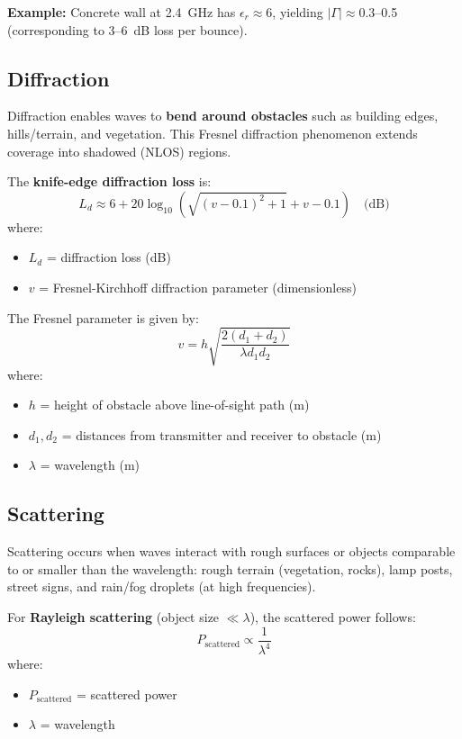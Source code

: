 \textbf{Example:} Concrete wall at 2.4~GHz has $\epsilon_r \approx 6$, yielding $|\Gamma| \approx 0.3$--0.5 (corresponding to 3--6~dB loss per bounce).

\subsection{Diffraction}

Diffraction enables waves to \textbf{bend around obstacles} such as building edges, hills/terrain, and vegetation. This Fresnel diffraction phenomenon extends coverage into shadowed (NLOS) regions.

The \textbf{knife-edge diffraction loss} is:
\begin{equation}
L_d \approx 6 + 20\log_{10}\left(\sqrt{(v-0.1)^2 + 1} + v - 0.1\right) \quad \text{(dB)}
\end{equation}
where:
\begin{itemize}
\item $L_d$ = diffraction loss (dB)
\item $v$ = Fresnel-Kirchhoff diffraction parameter (dimensionless)
\end{itemize}

The Fresnel parameter is given by:
\begin{equation}
v = h\sqrt{\frac{2(d_1 + d_2)}{\lambda d_1 d_2}}
\end{equation}
where:
\begin{itemize}
\item $h$ = height of obstacle above line-of-sight path (m)
\item $d_1, d_2$ = distances from transmitter and receiver to obstacle (m)
\item $\lambda$ = wavelength (m)
\end{itemize}

\subsection{Scattering}

Scattering occurs when waves interact with rough surfaces or objects comparable to or smaller than the wavelength: rough terrain (vegetation, rocks), lamp posts, street signs, and rain/fog droplets (at high frequencies).

For \textbf{Rayleigh scattering} (object size $\ll \lambda$), the scattered power follows:
\begin{equation}
P_{\text{scattered}} \propto \frac{1}{\lambda^4}
\end{equation}
where:
\begin{itemize}
\item $P_{\text{scattered}}$ = scattered power
\item $\lambda$ = wavelength
\end{itemize}

